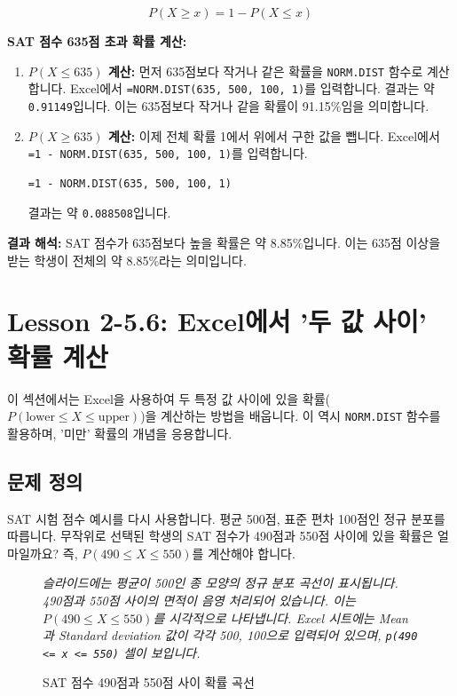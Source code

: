 \documentclass[11pt,a4paper]{book}
\providecommand{\newsection}{\section}
\theoremstyle{definition}
\begin{document}
\begin{equation*}
    P(X \ge x) = 1 - P(X \le x)
\end{equation*}

\begin{examplebox}
    \textbf{SAT 점수 635점 초과 확률 계산:}
    \begin{enumerate}
        \item \textbf{$P(X \le 635)$ 계산:}
        먼저 635점보다 작거나 같은 확률을 \texttt{NORM.DIST} 함수로 계산합니다.
        Excel에서 \texttt{=NORM.DIST(635, 500, 100, 1)}를 입력합니다.
        결과는 약 \texttt{0.91149}입니다.
        이는 635점보다 작거나 같을 확률이 91.15\%임을 의미합니다.

        \item \textbf{$P(X \ge 635)$ 계산:}
        이제 전체 확률 1에서 위에서 구한 값을 뺍니다.
        Excel에서 \texttt{=1 - NORM.DIST(635, 500, 100, 1)}를 입력합니다.
        \begin{lstlisting}[language=Excel, caption={Excel에서 '초과' 확률 계산 예시}, label={lst:norm_dist_greater_than}]
=1 - NORM.DIST(635, 500, 100, 1)
        \end{lstlisting}
        결과는 약 \texttt{0.088508}입니다.
    \end{enumerate}

    \textbf{결과 해석:}
    SAT 점수가 635점보다 높을 확률은 약 8.85\%입니다.
    이는 635점 이상을 받는 학생이 전체의 약 8.85\%라는 의미입니다.
\end{examplebox}

\newsection{Lesson 2-5.6: Excel에서 '두 값 사이' 확률 계산}

이 섹션에서는 Excel을 사용하여 두 특정 값 사이에 있을 확률($P(\text{lower} \le X \le \text{upper})$)을 계산하는 방법을 배웁니다.
이 역시 \texttt{NORM.DIST} 함수를 활용하며, '미만' 확률의 개념을 응용합니다.

\subsection{문제 정의}
SAT 시험 점수 예시를 다시 사용합니다. 평균 500점, 표준 편차 100점인 정규 분포를 따릅니다.
무작위로 선택된 학생의 SAT 점수가 490점과 550점 사이에 있을 확률은 얼마일까요?
즉, $P(490 \le X \le 550)$를 계산해야 합니다.

\begin{figure}[h!]
    \centering
    \caption{SAT 점수 490점과 550점 사이 확률 곡선}
    \label{fig:sat_between_values}
    \vspace{0.5em}
    \textit{슬라이드에는 평균이 500인 종 모양의 정규 분포 곡선이 표시됩니다. 490점과 550점 사이의 면적이 음영 처리되어 있습니다. 이는 $P(490 \le X \le 550)$를 시각적으로 나타냅니다. Excel 시트에는 Mean과 Standard deviation 값이 각각 500, 100으로 입력되어 있으며, \texttt{p(490 <= x <= 550)} 셀이 보입니다.}
\end{figure}
\end{document}
